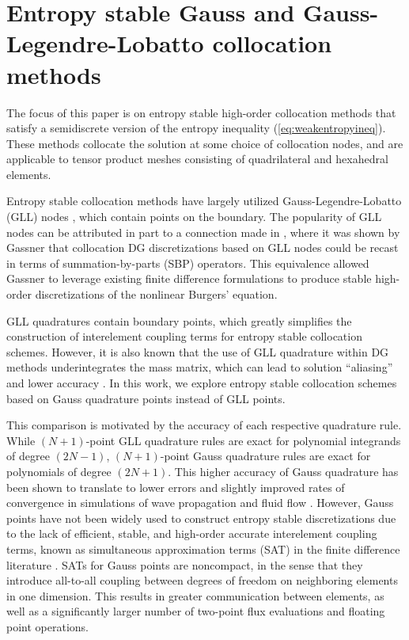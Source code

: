 \documentclass[review,onefignum,onetabnum,final]{siamart171218}
\begin{document}
\section{Entropy stable Gauss and Gauss-Legendre-Lobatto collocation methods}
\label{sec:1}

The focus of this paper is on entropy stable high-order collocation methods that satisfy a semidiscrete version of the entropy inequality (\ref{eq:weakentropyineq}).  These methods collocate the solution at some choice of collocation nodes, and are applicable to tensor product meshes consisting of quadrilateral and hexahedral elements.  

Entropy stable collocation methods have largely utilized Gauss-Legendre-Lobatto (GLL) nodes \cite{fisher2013high, carpenter2014entropy, gassner2016split, gassner2017br1}, which contain points on the boundary.  The popularity of GLL nodes can be attributed in part to a connection made in \cite{gassner2013skew}, where it was shown by Gassner that collocation DG discretizations based on GLL nodes could be recast in terms of summation-by-parts (SBP) operators.  This equivalence allowed Gassner to leverage existing finite difference formulations to produce stable high-order discretizations of the nonlinear Burgers' equation.  

GLL quadratures contain boundary points, which greatly simplifies the construction of interelement coupling terms for entropy stable collocation schemes.  However, it is also known that the use of GLL quadrature within DG methods underintegrates the mass matrix, which can lead to solution ``aliasing'' and lower accuracy \cite{parsani2016entropy}.  In this work, we explore entropy stable collocation schemes based on Gauss quadrature points instead of GLL points.  

This comparison is motivated by the accuracy of each respective quadrature rule.  While $(N+1)$-point GLL quadrature rules are exact for polynomial integrands of degree $(2N-1)$, $(N+1)$-point Gauss quadrature rules are exact for polynomials of degree $(2N+1)$.  This higher accuracy of Gauss quadrature has been shown to translate to lower errors and slightly improved rates of convergence in simulations of wave propagation and fluid flow \cite{kopriva2010quadrature, hindenlang2012explicit, chan2015gpu}.  However, Gauss points have not been widely used to construct entropy stable discretizations due to the lack of efficient, stable, and high-order accurate interelement coupling terms, known as simultaneous approximation terms (SAT) in the finite difference literature \cite{fernandez2014review, crean2017high, fernandez2018simultaneous}.  SATs for Gauss points are noncompact, in the sense that they introduce all-to-all coupling between degrees of freedom on neighboring elements in one dimension.  This results in greater communication between elements, as well as a significantly larger number of two-point flux evaluations and floating point operations.  
\end{document}
